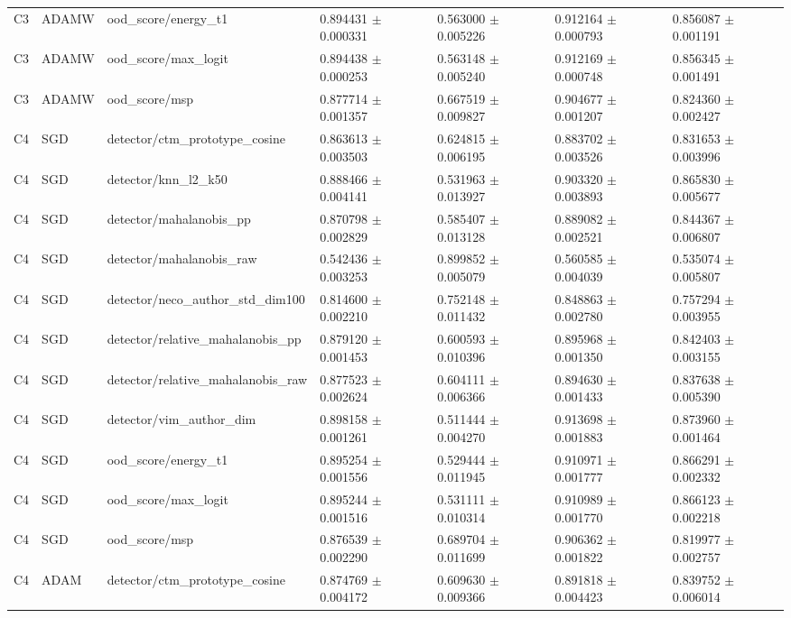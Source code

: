 \begin{longtable}{lllllll}
C3 & ADAMW & ood\_score/energy\_t1 & 0.894431 $\pm$ 0.000331 & 0.563000 $\pm$ 0.005226 & 0.912164 $\pm$ 0.000793 & 0.856087 $\pm$ 0.001191 \\
C3 & ADAMW & ood\_score/max\_logit & 0.894438 $\pm$ 0.000253 & 0.563148 $\pm$ 0.005240 & 0.912169 $\pm$ 0.000748 & 0.856345 $\pm$ 0.001491 \\
C3 & ADAMW & ood\_score/msp & 0.877714 $\pm$ 0.001357 & 0.667519 $\pm$ 0.009827 & 0.904677 $\pm$ 0.001207 & 0.824360 $\pm$ 0.002427 \\
C4 & SGD & detector/ctm\_prototype\_cosine & 0.863613 $\pm$ 0.003503 & 0.624815 $\pm$ 0.006195 & 0.883702 $\pm$ 0.003526 & 0.831653 $\pm$ 0.003996 \\
C4 & SGD & detector/knn\_l2\_k50 & 0.888466 $\pm$ 0.004141 & 0.531963 $\pm$ 0.013927 & 0.903320 $\pm$ 0.003893 & 0.865830 $\pm$ 0.005677 \\
C4 & SGD & detector/mahalanobis\_pp & 0.870798 $\pm$ 0.002829 & 0.585407 $\pm$ 0.013128 & 0.889082 $\pm$ 0.002521 & 0.844367 $\pm$ 0.006807 \\
C4 & SGD & detector/mahalanobis\_raw & 0.542436 $\pm$ 0.003253 & 0.899852 $\pm$ 0.005079 & 0.560585 $\pm$ 0.004039 & 0.535074 $\pm$ 0.005807 \\
C4 & SGD & detector/neco\_author\_std\_dim100 & 0.814600 $\pm$ 0.002210 & 0.752148 $\pm$ 0.011432 & 0.848863 $\pm$ 0.002780 & 0.757294 $\pm$ 0.003955 \\
C4 & SGD & detector/relative\_mahalanobis\_pp & 0.879120 $\pm$ 0.001453 & 0.600593 $\pm$ 0.010396 & 0.895968 $\pm$ 0.001350 & 0.842403 $\pm$ 0.003155 \\
C4 & SGD & detector/relative\_mahalanobis\_raw & 0.877523 $\pm$ 0.002624 & 0.604111 $\pm$ 0.006366 & 0.894630 $\pm$ 0.001433 & 0.837638 $\pm$ 0.005390 \\
C4 & SGD & detector/vim\_author\_dim & 0.898158 $\pm$ 0.001261 & 0.511444 $\pm$ 0.004270 & 0.913698 $\pm$ 0.001883 & 0.873960 $\pm$ 0.001464 \\
C4 & SGD & ood\_score/energy\_t1 & 0.895254 $\pm$ 0.001556 & 0.529444 $\pm$ 0.011945 & 0.910971 $\pm$ 0.001777 & 0.866291 $\pm$ 0.002332 \\
C4 & SGD & ood\_score/max\_logit & 0.895244 $\pm$ 0.001516 & 0.531111 $\pm$ 0.010314 & 0.910989 $\pm$ 0.001770 & 0.866123 $\pm$ 0.002218 \\
C4 & SGD & ood\_score/msp & 0.876539 $\pm$ 0.002290 & 0.689704 $\pm$ 0.011699 & 0.906362 $\pm$ 0.001822 & 0.819977 $\pm$ 0.002757 \\
C4 & ADAM & detector/ctm\_prototype\_cosine & 0.874769 $\pm$ 0.004172 & 0.609630 $\pm$ 0.009366 & 0.891818 $\pm$ 0.004423 & 0.839752 $\pm$ 0.006014 \\

\end{longtable}
